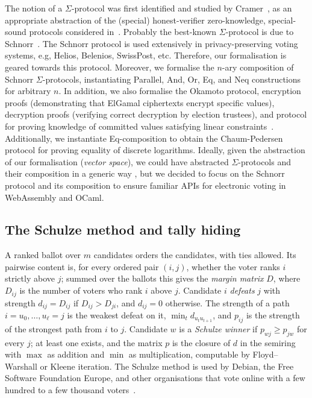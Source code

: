 The notion of a $\Sigma$-protocol was first identified and studied by Cramer~\cite{cramer1996modular},
as an appropriate abstraction of the (special) honest-verifier zero-knowledge, special-sound protocols considered in~\cite{cramer1994proofs}.
Probably the best-known $\Sigma$-protocol is due to Schnorr~\cite{schnorr1991efficient}.
The Schnorr protocol is used extensively in privacy-preserving voting systems, e.g, Helios, Belenios, SwissPost, etc. Therefore, 
our formalisation is geared towards this protocol. Moreover, we formalise the $n$-ary composition of Schnorr $\Sigma$-protocols, instantiating Parallel, And, Or, Eq, and Neq constructions for arbitrary $n$. In addition, we also formalise the Okamoto protocol, encryption proofs (demonstrating that ElGamal ciphertexts encrypt specific values), decryption proofs (verifying correct decryption by election trustees), and protocol for proving knowledge of committed values satisfying linear constraints~\cite{Bra97}. Additionally, we instantiate Eq-composition to obtain the Chaum-Pedersen protocol for proving equality of discrete logarithms. Ideally, given the abstraction of our formalisation (\textit{vector space}), we could have 
abstracted $\Sigma$-protocols and their composition in a generic way \cite{10.1007/978-3-642-02384-2_17},
but we decided to focus on the Schnorr protocol and its composition to ensure familiar APIs 
for electronic voting in WebAssembly and OCaml.

\subsection{The Schulze method and tally hiding}\label{sec:bg:schulze}
A ranked ballot over $m$ candidates orders the candidates, with ties
allowed. Its pairwise content is, for every ordered pair $(i,j)$, whether
the voter ranks $i$ strictly above $j$; summed over the ballots this gives
the \emph{margin matrix} $D$, where $D_{ij}$ is the number of voters who
rank $i$ above $j$. Candidate $i$ \emph{defeats} $j$ with strength
$d_{ij} = D_{ij}$ if $D_{ij} > D_{ji}$, and $d_{ij} = 0$ otherwise. The
strength of a path $i = u_0, \ldots, u_\ell = j$ is the weakest defeat on
it, $\min_t d_{u_t u_{t+1}}$, and $p_{ij}$ is the strength of the strongest
path from $i$ to $j$. Candidate $w$ is a \emph{Schulze winner} if
$p_{wj} \ge p_{jw}$ for every $j$; at least one exists, and the matrix $p$
is the closure of $d$ in the semiring with $\max$ as addition and $\min$
as multiplication, computable by Floyd--Warshall or Kleene iteration. The
Schulze method is used by Debian, the Free Software Foundation Europe,
and other organisations that vote online with a few hundred to a few
thousand voters~\cite{10.1007/978-3-319-66107-0_26}.

